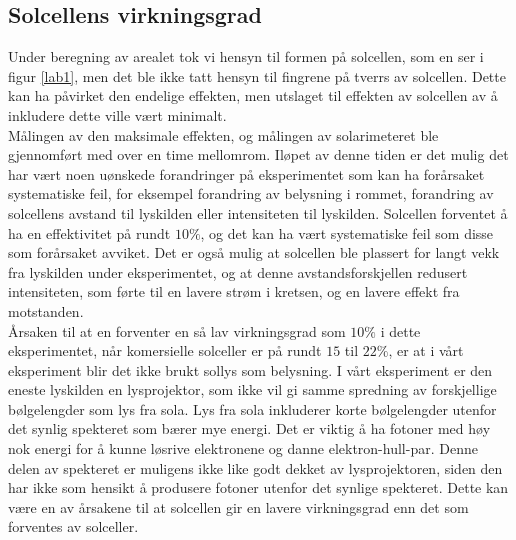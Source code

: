 \documentclass[%
 reprint,
 amsmath,amssymb,
 aps,
 norsk,
 booktabs
]{revtex4-1}
\begin{document}
\subsection{Solcellens virkningsgrad}
Under beregning av arealet tok vi hensyn til formen på solcellen, som en ser i figur \vref{lab1}, men det ble ikke tatt hensyn til fingrene på tverrs av solcellen. Dette kan ha påvirket den endelige effekten, men utslaget til effekten av solcellen av å inkludere dette ville vært minimalt.\\
Målingen av den maksimale effekten, og målingen av solarimeteret ble gjennomført med over en time mellomrom. Iløpet av denne tiden er det mulig det har vært noen uønskede forandringer på eksperimentet som kan ha forårsaket systematiske feil, for eksempel forandring av belysning i rommet, forandring av solcellens avstand til lyskilden eller intensiteten til lyskilden. Solcellen forventet å ha en effektivitet på rundt $10\%$, og det kan ha vært systematiske feil som disse som forårsaket avviket. Det er også mulig at solcellen ble plassert for langt vekk fra lyskilden under eksperimentet, og at denne avstandsforskjellen redusert intensiteten, som førte til en lavere strøm i kretsen, og en lavere effekt fra motstanden.\\
Årsaken til at en forventer en så lav virkningsgrad som $10\%$ i dette eksperimentet, når komersielle solceller er på rundt $15$ til $22\%$, er at i vårt eksperiment blir det ikke brukt sollys som belysning. I vårt eksperiment er den eneste lyskilden en lysprojektor, som ikke vil gi samme spredning av forskjellige bølgelengder som lys fra sola. Lys fra sola inkluderer korte bølgelengder utenfor det synlig spekteret som bærer mye energi. Det er viktig å ha fotoner med høy nok energi for å kunne løsrive elektronene og danne elektron-hull-par. Denne delen av spekteret er muligens ikke like godt dekket av lysprojektoren, siden den har ikke som hensikt å produsere fotoner utenfor det synlige spekteret. Dette kan være en av årsakene til at solcellen gir en lavere virkningsgrad enn det som forventes av solceller.
\end{document}
